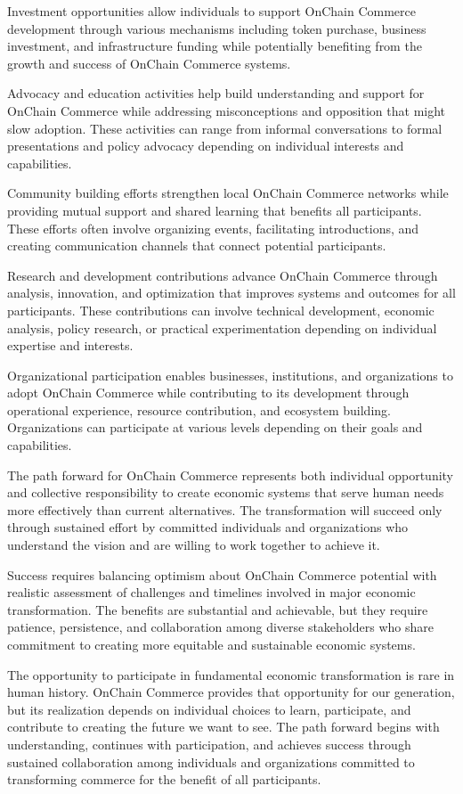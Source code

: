 \documentclass[
  Letterpaper,
]{scrbook}
\begin{document}
Investment opportunities allow individuals to support OnChain Commerce
development through various mechanisms including token purchase,
business investment, and infrastructure funding while potentially
benefiting from the growth and success of OnChain Commerce systems.

Advocacy and education activities help build understanding and support
for OnChain Commerce while addressing misconceptions and opposition that
might slow adoption. These activities can range from informal
conversations to formal presentations and policy advocacy depending on
individual interests and capabilities.

Community building efforts strengthen local OnChain Commerce networks
while providing mutual support and shared learning that benefits all
participants. These efforts often involve organizing events,
facilitating introductions, and creating communication channels that
connect potential participants.

Research and development contributions advance OnChain Commerce through
analysis, innovation, and optimization that improves systems and
outcomes for all participants. These contributions can involve technical
development, economic analysis, policy research, or practical
experimentation depending on individual expertise and interests.

Organizational participation enables businesses, institutions, and
organizations to adopt OnChain Commerce while contributing to its
development through operational experience, resource contribution, and
ecosystem building. Organizations can participate at various levels
depending on their goals and capabilities.

The path forward for OnChain Commerce represents both individual
opportunity and collective responsibility to create economic systems
that serve human needs more effectively than current alternatives. The
transformation will succeed only through sustained effort by committed
individuals and organizations who understand the vision and are willing
to work together to achieve it.

Success requires balancing optimism about OnChain Commerce potential
with realistic assessment of challenges and timelines involved in major
economic transformation. The benefits are substantial and achievable,
but they require patience, persistence, and collaboration among diverse
stakeholders who share commitment to creating more equitable and
sustainable economic systems.

The opportunity to participate in fundamental economic transformation is
rare in human history. OnChain Commerce provides that opportunity for
our generation, but its realization depends on individual choices to
learn, participate, and contribute to creating the future we want to
see. The path forward begins with understanding, continues with
participation, and achieves success through sustained collaboration
among individuals and organizations committed to transforming commerce
for the benefit of all participants.
\end{document}
